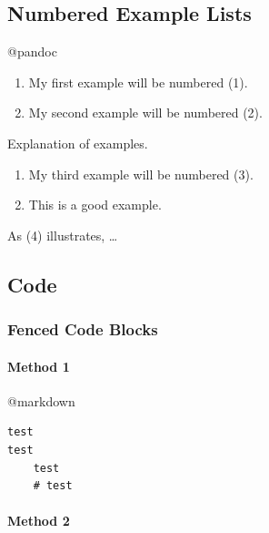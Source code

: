 \documentclass[]{article}
\newcommand{\VERB}{\Verb[commandchars=\\\{\}]}
\newcommand{\NormalTok}[1]{{#1}}
\providecommand{\tightlist}{%
  \setlength{\itemsep}{0pt}\setlength{\parskip}{0pt}}
\let\oldparagraph\paragraph
\renewcommand{\paragraph}[1]{\oldparagraph{#1}\mbox{}}
\begin{document}
\subsection{Numbered Example Lists}\label{numbered-example-lists}

@pandoc

\begin{enumerate}
\def\labelenumi{(\arabic{enumi})}
\tightlist
\item
  My first example will be numbered (1).
\item
  My second example will be numbered (2).
\end{enumerate}

Explanation of examples.

\begin{enumerate}
\def\labelenumi{(\arabic{enumi})}
\setcounter{enumi}{2}
\item
  My third example will be numbered (3).
\item
  This is a good example.
\end{enumerate}

As (4) illustrates, \ldots{}

\subsection{Code}\label{code}


\subsubsection{Fenced Code Blocks}\label{fenced-code-blocks}

\paragraph{Method 1}\label{method-1-1}

@markdown

\begin{verbatim}
test
test
    test
    # test
\end{verbatim}

\paragraph{Method 2}\label{method-2-1}
\end{document}
